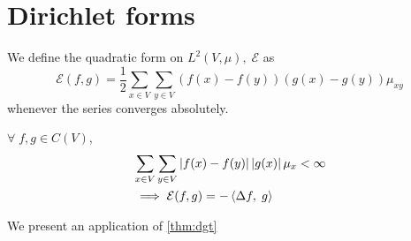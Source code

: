 \documentclass[main]{subfiles}
\begin{document}
\section{Dirichlet forms}
\begin{definition}
    We define the quadratic form on $L^2(V,\mu),\; \mathcal{E}$ as
    $$\mathcal{E}(f,g) = \frac{1}{2}\sum_{x \in V}\sum_{y \in V}(f(x)-f(y))(g(x)-g(y))\mu_{xy}$$
    whenever the series converges absolutely.
\end{definition}
\begin{theorem}
    $\forall\;f,g \in C(V)$,
    \begin{align*}
         & \sum_{x \in V}\sum_{y \in V}\left\lvert f(x)-f(y)\right\rvert\left\lvert g(x)\right\rvert\mu_x < \infty \\
         & \implies \mathcal{E}(f,g) = - \left\langle\Delta f,\;g\right\rangle
    \end{align*}
    \label{thm:dgt}
\end{theorem}
We present an application of \eqref{thm:dgt}
\end{document}
